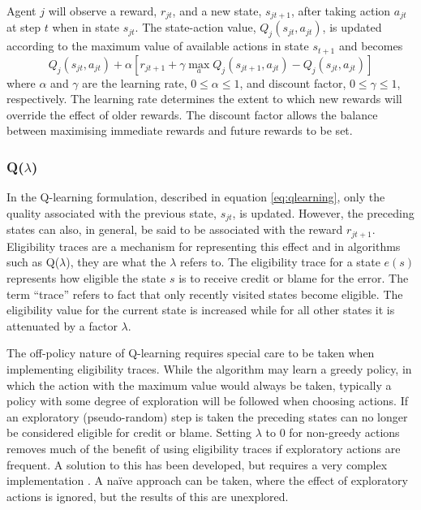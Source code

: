 Agent $j$ will observe a reward, $r_{jt}$, and a new state, $s_{jt+1}$,
after taking action $a_{jt}$ at step $t$ when in state $s_{jt}$.  The
state-action value, $Q_j(s_{jt},a_{jt})$, is updated according to the
maximum value of available actions in state $s_{t+1}$ and becomes
\begin{equation}
\label{eq:qlearning}
Q_j(s_{jt},a_{jt}) + \alpha [r_{jt+1} + \gamma\max_{a} Q_j(s_{jt+1},a_{jt}) -
Q_j(s_{jt},a_{jt})]
\end{equation}
where $\alpha$ and $\gamma$ are the learning rate, $0\leq\alpha\leq1$, and
discount factor, $0\leq\gamma\leq1$, respectively.  The learning rate
determines the extent to which new rewards will override the effect of older
rewards.  The discount factor allows the balance between maximising immediate
rewards and future rewards to be set.

\subsubsection{Q($\lambda$)}
\label{sec:qlambda}
In the Q-learning formulation, described in equation \ref{eq:qlearning}, only
the quality associated with the previous state, $s_{jt}$, is updated.  However,
the preceding states can also, in general, be said to be associated with the
reward $r_{jt+1}$.  Eligibility traces are a mechanism for representing this
effect and in algorithms such as Q($\lambda$), they are what the $\lambda$
refers to.  The eligibility trace for a state $e(s)$ represents how eligible
the state $s$ is to receive credit or blame for the error.  The term ``trace''
refers to fact that only recently visited states become eligible.  The
eligibility value for the current state is increased while for all other
states it is attenuated by a factor $\lambda$.

The off-policy nature of Q-learning requires special care to be taken when
implementing eligibility traces.  While the algorithm may learn a greedy
policy, in which the action with the maximum value would always be taken,
typically a policy with some degree of exploration will be followed when
choosing actions.  If an exploratory (pseudo-random) step is taken the
preceding states can no longer be considered eligible for credit or blame.
Setting $\lambda$ to $0$ for non-greedy actions removes much of the benefit of
using eligibility traces if exploratory actions are frequent.  A solution to
this has been developed, but requires a very complex implementation
\cite{peng:1996}.  A na\"ive approach can be taken, where the effect of
exploratory actions is ignored, but the results of this are unexplored.

